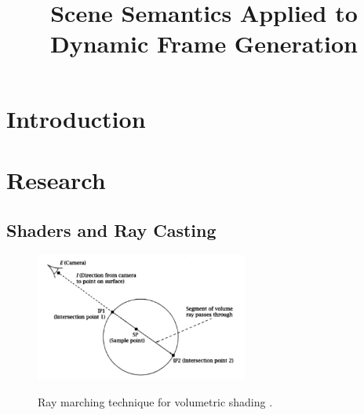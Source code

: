 \documentclass[conference]{IEEEtran}
\begin{document}
\title{Scene Semantics Applied to \\ Dynamic Frame Generation}

\author{
}

\maketitle

\section{Introduction}
\label{sec:introduction}

\section{Research}

\subsection{Shaders and Ray Casting}
\begin{figure}[htbp]
\centering
{\includegraphics[width=7cm]{ray_marching.png}}
\caption{Ray marching technique for volumetric shading \cite{ray_marching}.}
\label{fig:ray_marching}
\end{figure}
\end{document}
